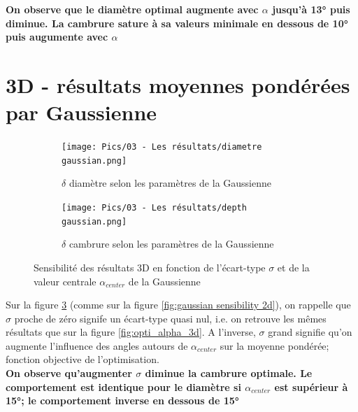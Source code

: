 


\textbf{On observe que le diamètre optimal augmente avec $\alpha$ jusqu'à 13° puis diminue. La cambrure sature à sa valeurs minimale en dessous de 10° puis augumente avec $\alpha$ }


\section{3D - résultats moyennes pondérées par Gaussienne}
\label{sec:Ch3.3}

\begin{figure}[H]
    \centering
    \begin{subfigure}[b]{0.45\textwidth}
        \centering
        \texttt{[image: Pics/03 - Les résultats/diametre gaussian.png]}
        \caption{$\delta$ diamètre selon les paramètres de la Gaussienne}
        \label{fig:diametre gaussien}
    \end{subfigure}
    \hfill
    \begin{subfigure}[b]{0.45\textwidth}
        \centering
        \texttt{[image: Pics/03 - Les résultats/depth gaussian.png]}
        \caption{$\delta$ cambrure selon les paramètres de la Gaussienne}
        \label{fig:cambrure gaussien}
    \end{subfigure}
    \caption{Sensibilité des résultats 3D en fonction de l'écart-type $\sigma$ et de la valeur centrale $\alpha_{center}$ de la Gaussienne}
    \label{fig:gaussian sensibility}
\end{figure}


Sur la figure \ref{fig:gaussian sensibility} (comme sur la figure \ref{fig:gaussian sensibility 2d}), on rappelle que $\sigma$ proche de zéro signife un écart-type quasi nul, i.e. on retrouve les mêmes résultats que sur la figure \ref{fig:opti_alpha_3d}. A l'inverse, $\sigma$ grand signifie qu'on augmente l'influence des angles autours de $\alpha_{center}$ sur la moyenne pondérée; fonction objective de l'optimisation. \\

\textbf{ On observe qu'augmenter $\sigma$ diminue la cambrure optimale. Le comportement est identique pour le diamètre si $\alpha_{center}$ est supérieur à 15°; le comportement inverse en dessous de 15°}
    

